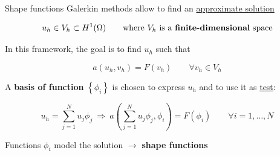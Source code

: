 \begin{frame}{Shape functions}
   Galerkin methods allow to find an \underline{approximate solution}
   
   \begin{equation*}
      u_h\in V_h\subset H^1(\Omega) \qquad \text{where } V_h \ \text{is a \textbf{finite-dimensional} space} 
   \end{equation*}

   In this framework, the goal is to find $u_h$ such that

   \begin{equation*}
      \boxed{a\left(u_h,v_h\right)=F\left(v_h\right) \qquad \forall v_h\in V_h}
   \end{equation*}

   \vfill

   \pause

   A \textbf{basis of function} $\left\{\phi_i\right\}$ is chosen to express $u_h$ and to use it as \underline{test}:

   \begin{equation*}
      u_h=\sum_{j=1}^Nu_j\phi_j \ \Longrightarrow \ a\left(\sum_{j=1}^Nu_j\phi_j,\phi_i\right)=F\left(\phi_i\right) \qquad \forall i=1,\dots,N
   \end{equation*}

   \vfill

   \pause

   \begin{center}
      Functions $\phi_i$ model the solution $\longrightarrow$ \textbf{\textcolor{BrickRed}{shape functions}}
   \end{center}
\end{frame}

